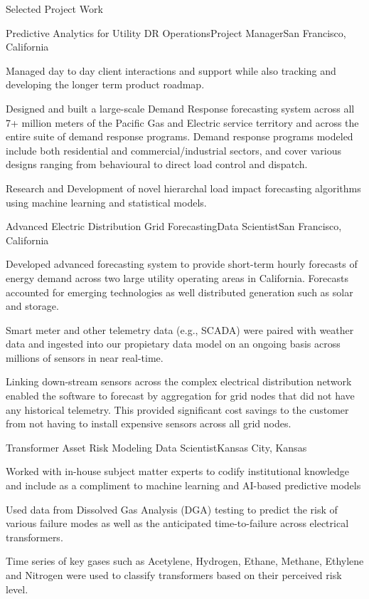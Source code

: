 \documentclass{resume} %
\begin{document}
\begin{rSection}{Selected Project Work}

\begin{rSubsection}{Predictive Analytics for Utility DR Operations}{}{Project Manager}{San Francisco, California}
\item[] Managed day to day client interactions and support while also tracking and developing the longer term product roadmap.
\item[] Designed and built a large-scale Demand Response forecasting system across all 7+ million meters of the Pacific Gas and Electric service territory and across the entire suite of demand response programs. Demand response programs modeled include both residential and commercial/industrial sectors, and cover various designs ranging from behavioural to direct load control and dispatch.
\item[] Research and Development of novel hierarchal load impact forecasting algorithms using machine learning and statistical models.
\end{rSubsection}

\begin{rSubsection}{Advanced Electric Distribution Grid Forecasting}{}{Data Scientist}{San Francisco, California}
\item[] Developed advanced forecasting system to provide short-term hourly forecasts of energy demand across two large utility operating areas in California. Forecasts accounted for emerging technologies as well distributed generation such as solar and storage.
\item[] Smart meter and other telemetry data (e.g., SCADA) were paired with weather data and ingested into our propietary data model on an ongoing basis across millions of sensors in near real-time.
\item[] Linking down-stream sensors across the complex electrical distribution network enabled the software to forecast by aggregation for grid nodes that did not have any historical telemetry. This provided significant cost savings to the customer from not having to install expensive sensors across all grid nodes.
\end{rSubsection}

\begin{rSubsection}{Transformer Asset Risk Modeling }{}{Data Scientist}{Kansas City, Kansas}
\item[] Worked with in-house subject matter experts to codify institutional knowledge and include as a compliment to machine learning and AI-based predictive models
\item[] Used data from Dissolved Gas Analysis (DGA) testing  to predict the risk of various failure modes as well as the anticipated time-to-failure across electrical transformers.
\item[] Time series of key gases such as Acetylene, Hydrogen, Ethane, Methane, Ethylene and Nitrogen were used to classify transformers based on their perceived risk level.
\end{rSubsection}


\end{rSection}
\end{document}
